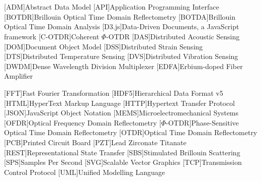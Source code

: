\cleardoublepage
\chapter*{\listofabbrevname}
{}

\begin{acronym}[KolikMista]
        [ADM]{Abstract Data Model}
        [API]{Application Programming Interface}
        [BOTDR]{Brillouin Optical Time Domain Reflectometry}
        [BOTDA]{Brillouin Optical Time Domain Analysis}
        [D3.js]{Data-Driven Documents, a JavaScript framework}
        [C-OTDR]{Coherent $\Phi$-OTDR}
        [DAS]{Distributed Acoustic Sensing}
        [DOM]{Document Object Model}
        [DSS]{Distributed Strain Sensing}
        [DTS]{Distributed Temperature Sensing}
        [DVS]{Distributed Vibration Sensing}
        [DWDM]{Dense Wavelength Division Multiplexer}
        [EDFA]{Erbium-doped Fiber Amplifier}
        
        [FFT]{Fast Fourier Transformation}
        [HDF5]{Hierarchical Data Format v5}
        [HTML]{HyperText Markup Language}
        [HTTP]{Hypertext Transfer Protocol}
        [JSON]{JavaScript Object Notation}
        [MEMS]{Microelectromechanical Systems}
        [OFDR]{Optical Frequency Domain Reflectometry}
        [$\Phi$-OTDR]{Phase-Sensitive Optical Time Domain Reflectometry}
        [OTDR]{Optical Time Domain Reflectometry}
        [PCB]{Printed Circuit Board}
        [PZT]{Lead Zirconate Titanate}
        [REST]{Representational State Transfer}
        [SBS]{Stimulated Brillouin Scattering}
        [SPS]{Samples Per Second}
        [SVG]{Scalable Vector Graphics}
        [TCP]{Transmission Control Protocol}
        [UML]{Unified Modelling Language}



\end{acronym}
